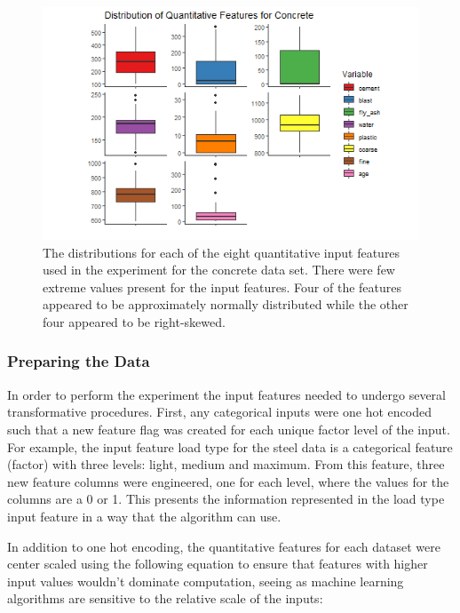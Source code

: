 \documentclass[10pt]{article}\usepackage[]{graphicx}\usepackage[]{xcolor}
\begin{document}
\begin{figure}[htp]
  \centering
  \includegraphics[scale=0.8]{EDA/boxplots_concrete_features.png}
  \caption{The distributions for each of the eight quantitative input features used in the experiment for the concrete data set. There were few extreme values present for the input features. Four of the features appeared to be approximately normally distributed while the other four appeared to be right-skewed.}
  \label{img:concrete_boxplots}
\end{figure}

\newpage



\subsubsection{Preparing the Data}
In order to perform the experiment the input features needed to undergo several transformative procedures. First, any categorical inputs were one hot encoded such that a new feature flag was created for each unique factor level of the input. For example, the input feature load type for the steel data is a categorical feature (factor) with three levels: light, medium and maximum. From this feature, three new feature columns were engineered, one for each level, where the values for the columns are a 0 or 1. This presents the information represented in the load type input feature in a way that the algorithm can use.

In addition to one hot encoding, the quantitative features for each dataset were center scaled using the following equation to ensure that features with higher input values wouldn't dominate computation, seeing as machine learning algorithms are sensitive to the relative scale of the inputs:
\end{document}
